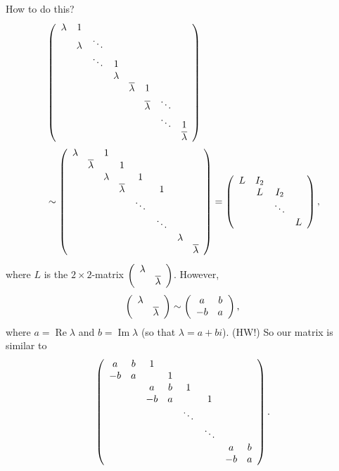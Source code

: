 \documentclass[numbers=enddot,12pt,final,onecolumn,notitlepage]{scrartcl}%
\numberwithin{exer}{subsection}
\theoremstyle{definition}
\begin{document}
How to do this?%
\begin{align*}
& \left(
\begin{array}
[c]{cccccccc}%
\lambda & 1 &  &  &  &  &  & \\
& \lambda & \ddots &  &  &  &  & \\
&  & \ddots & 1 &  &  &  & \\
&  &  & \lambda &  &  &  & \\
&  &  &  & \overline{\lambda} & 1 &  & \\
&  &  &  &  & \overline{\lambda} & \ddots & \\
&  &  &  &  &  & \ddots & 1\\
&  &  &  &  &  &  & \overline{\lambda}%
\end{array}
\right)  \\
& \sim\left(
\begin{array}
[c]{cccccccc}%
\lambda &  & 1 &  &  &  &  & \\
& \overline{\lambda} &  & 1 &  &  &  & \\
&  & \lambda &  & 1 &  &  & \\
&  &  & \overline{\lambda} &  & 1 &  & \\
&  &  &  & \ddots &  &  & \\
&  &  &  &  & \ddots &  & \\
&  &  &  &  &  & \lambda & \\
&  &  &  &  &  &  & \overline{\lambda}%
\end{array}
\right)  =\left(
\begin{array}
[c]{cccc}%
L & I_{2} &  & \\
& L & I_{2} & \\
&  & \ddots & \\
&  &  & L
\end{array}
\right)  ,
\end{align*}
where $L$ is the $2\times2$-matrix $\left(
\begin{array}
[c]{cc}%
\lambda & \\
& \overline{\lambda}%
\end{array}
\right)  $. However,%
\[
\left(
\begin{array}
[c]{cc}%
\lambda & \\
& \overline{\lambda}%
\end{array}
\right)  \sim\left(
\begin{array}
[c]{cc}%
a & b\\
-b & a
\end{array}
\right)  ,
\]
where $a=\operatorname*{Re}\lambda$ and $b=\operatorname*{Im}\lambda$ (so that
$\lambda=a+bi$). (HW!) So our matrix is similar to%
\[
\left(
\begin{array}
[c]{cccccccc}%
a & b & 1 &  &  &  &  & \\
-b & a &  & 1 &  &  &  & \\
&  & a & b & 1 &  &  & \\
&  & -b & a &  & 1 &  & \\
&  &  &  & \ddots &  &  & \\
&  &  &  &  & \ddots &  & \\
&  &  &  &  &  & a & b\\
&  &  &  &  &  & -b & a
\end{array}
\right)  .
\]
\end{document}
